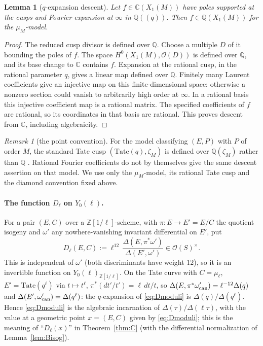 \documentclass[11pt,a4paper]{article}
\numberwithin{equation}{section}
\newtheorem{lemma}[theorem]{Lemma}
\theoremstyle{definition}
\theoremstyle{remark}
\newtheorem{remark}[theorem]{Remark}
\newcommand{\Z}{\mathbb Z}
\newcommand{\Q}{\mathbb Q}
\begin{document}
\begin{lemma}[$q$-expansion descent]\label{lem:qexp}
Let $f\in\mathbb C(X_1(M))$ have poles supported at the cusps and Fourier expansion
at $\infty$ in $\Q((q))$. Then $f\in\Q(X_1(M))$ for the $\mu_M$-model.
\end{lemma}
\begin{proof}
The reduced cusp divisor is defined over $\Q$. Choose a multiple $D$ of it bounding
the poles of $f$. The space $H^0(X_1(M),\mathcal O(D))$ is defined over $\Q$, and its
base change to $\mathbb C$ contains $f$. Expansion at the rational cusp, in the
rational parameter $q$, gives a linear map defined over $\Q$. Finitely many Laurent
coefficients give an injective map on this finite-dimensional space: otherwise a
nonzero section could vanish to arbitrarily high order at $\infty$.
In a rational basis this injective coefficient map is a rational matrix. The
specified coefficients of $f$ are rational, so its coordinates in that basis are
rational. This proves descent from $\mathbb C$, including algebraicity.
\end{proof}

\begin{remark}[the point convention]\label{rem:point}
For the model classifying $(E,P)$ with $P$ of order $M$, the standard Tate cusp
$(\mathrm{Tate}(q),\zeta_M)$ is defined over $\Q(\zeta_M)$ rather than $\Q$
\citep[Example~2.3]{ConradQexp}. Rational Fourier coefficients do not by themselves
give the same descent assertion on that model. We use only the $\mu_M$-model,
its rational Tate cusp and the diamond convention fixed above.
\end{remark}

\paragraph{The function $D_\ell$ on $Y_0(\ell)$.} For a pair $(E,C)$ over a $\Z[1/\ell]$-scheme, with
$\pi:E\to E'=E/C$ the quotient isogeny and $\omega'$ any nowhere-vanishing invariant differential on
$E'$, put
\begin{equation}\label{eq:Dmoduli}
D_\ell(E,C):=\ell^{12}\,\frac{\Delta(E,\pi^*\omega')}{\Delta(E',\omega')}\in\mathcal O(S)^\times .
\end{equation}
This is independent of $\omega'$ (both discriminants have weight $12$), so it is an invertible
function on $Y_0(\ell)_{\Z[1/\ell]}$. On the Tate curve with $C=\mu_\ell$, $E'=\mathrm{Tate}(q^\ell)$
via $t\mapsto t^\ell$, $\pi^*(dt'/t')=\ell\,dt/t$, so
$\Delta(E,\pi^*\omega'_{\rm can})=\ell^{-12}\Delta(q)$ and $\Delta(E',\omega'_{\rm can})=\Delta(q^\ell)$:
the $q$-expansion of \eqref{eq:Dmoduli} is $\Delta(q)/\Delta(q^\ell)$. Hence
\eqref{eq:Dmoduli} is the algebraic incarnation of $\Delta(\tau)/\Delta(\ell\tau)$, with the value
at a geometric point $x=(E,C)$ given by \eqref{eq:Dmoduli}; this is the meaning of
``$D_\ell(x)$'' in Theorem~\ref{thm:C} (with the differential normalization of Lemma~\ref{lem:Bisog}).
\end{document}
